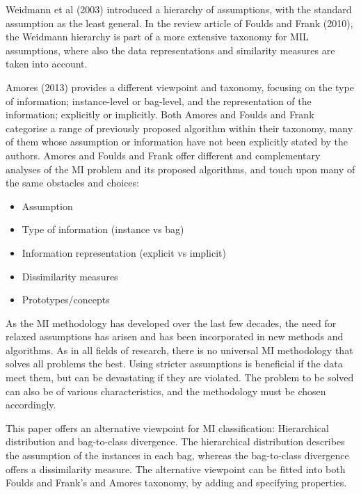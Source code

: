 {\color{green} Weidmann et al (2003)} introduced a hierarchy of assumptions, with the standard assumption as the least general. 
In the review article of {\color{green} Foulds and Frank (2010)}, the Weidmann hierarchy is part of a more extensive taxonomy for MIL assumptions, where also the data representations and similarity measures are taken into account. 

{\color{green} Amores (2013)} provides a different viewpoint and taxonomy, focusing on the type of information; instance-level or bag-level, and the representation of the information; explicitly or implicitly. 
Both Amores and Foulds and Frank categorise a range of previously proposed algorithm within their taxonomy, many of them whose assumption or information have not been explicitly stated by the authors. 
Amores and Foulds and Frank offer different and complementary analyses of the MI problem and its proposed algorithms, and touch upon many of the same obstacles and choices: 
\begin{itemize}
  \item Assumption
  \item Type of information (instance vs bag)
  \item Information representation (explicit vs implicit)
  \item Dissimilarity measures
  \item Prototypes/concepts
\end{itemize}

As the MI methodology has developed over the last few decades, the need for relaxed assumptions has arisen and has been incorporated in new methods and algorithms. 
As in all fields of research, there is no universal MI methodology that solves all problems the best. 
Using stricter assumptions is beneficial if the data meet them, but can be devastating if they are violated.
The problem to be solved can also be of various characteristics, and the methodology must be chosen accordingly. 

This paper offers an alternative viewpoint for MI classification: Hierarchical distribution and bag-to-class divergence. 
The hierarchical distribution describes the assumption of the instances in each bag, whereas the bag-to-class divergence offers a dissimilarity measure. 
The alternative viewpoint can be fitted into both Foulds and Frank's and Amores taxonomy, by adding and specifying properties. 


